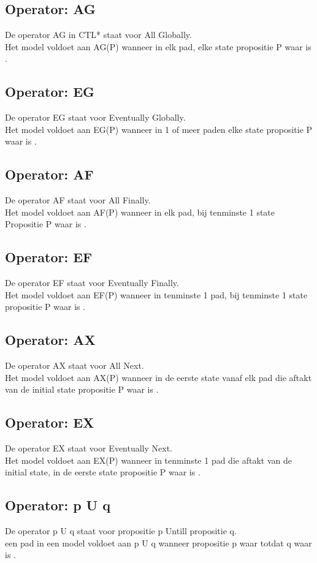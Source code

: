 \subsection{Operator: AG}
De operator AG in CTL* staat voor All Globally. \\ Het model voldoet aan AG(P)  wanneer in elk pad, elke state propositie P waar is \cite{modelchecking}. 
\subsection{Operator: EG}
De operator EG staat voor Eventually Globally. \\ Het model voldoet aan EG(P) wanneer in 1 of meer paden elke state propositie P waar is \cite{modelchecking}.
\subsection{Operator: AF}
De operator AF staat voor All Finally. \\ Het model voldoet aan AF(P) wanneer in elk pad, bij tenminste 1 state Propositie P waar is \cite{modelchecking}.
\subsection{Operator: EF}
De operator EF staat voor Eventually Finally. \\ Het model voldoet aan EF(P)  wanneer in tenminste 1 pad, bij tenminste 1 state propositie P waar is \cite{modelchecking}.
\subsection{Operator: AX}
De operator AX staat voor All Next. \\ Het model voldoet aan AX(P) wanneer in de eerste state vanaf elk pad die aftakt van de initial state propositie P waar is \cite{modelchecking}.
\subsection{Operator: EX}
De operator EX staat voor Eventually Next. \\ Het model voldoet aan EX(P) wanneer in tenminste 1 pad die aftakt van de initial state, in de eerste state propositie P waar is \cite{modelchecking}.
\subsection{Operator: p U q}
De operator p U q staat voor propositie p Untill propositie q. \\ een pad in een model voldoet aan p U q wanneer propositie p waar totdat q waar is \cite{modelchecking}.
